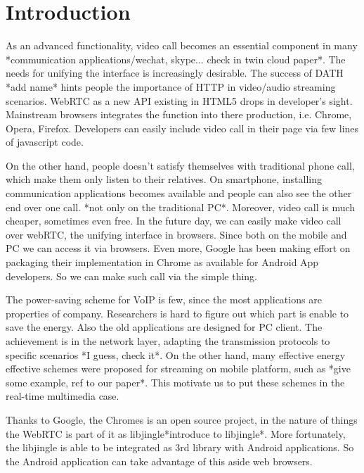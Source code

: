\section{Introduction}

As an advanced functionality, video call becomes an essential
component in many *communication applications/wechat, skype... check
in twin cloud paper*. The needs for unifying the interface is
increasingly desirable. The success of DATH *add name* hints people
the importance of HTTP in video/audio streaming scenarios. WebRTC as a
new API existing in HTML5 drops in developer's sight. Mainstream
browsers integrates the function into there production, i.e. Chrome,
Opera, Firefox. Developers can easily include video call in their page
via few lines of javascript code.

On the other hand, people doesn't satisfy themselves with traditional
phone call, which make them only listen to their relatives. On
smartphone, installing communication applications becomes available
and people can also see the other end over one call. *not only on the
traditional PC*. Moreover, video call is much cheaper, sometimes even
free. In the future day, we can easily make video call over webRTC,
the unifying interface in browsers. Since both on the mobile and PC we
can access it via browsers. Even more, Google has been making effort
on packaging their implementation in Chrome as available for Android
App developers. So we can make such call via the simple thing.


The power-saving scheme for VoIP is few, since the most applications
are properties of company. Researchers is hard to figure out which
part is enable to save the energy. Also the old applications are
designed for PC client. The achievement is in the network layer,
adapting the transmission protocols to specific scenarios *I guess,
check it*. On the other hand, many effective energy effective schemes
were proposed for streaming on mobile platform, such as *give some
example, ref to our paper*. This motivate us to put these schemes in
the real-time multimedia case.

Thanks to Google, the Chromes is an open source project, in the nature
of things the WebRTC is part of it as libjingle*introduce to
libjingle*. More fortunately, the libjingle is able to be integrated
as 3rd library with Android applications. So the Android application
can take advantage of this aside web browsers.

